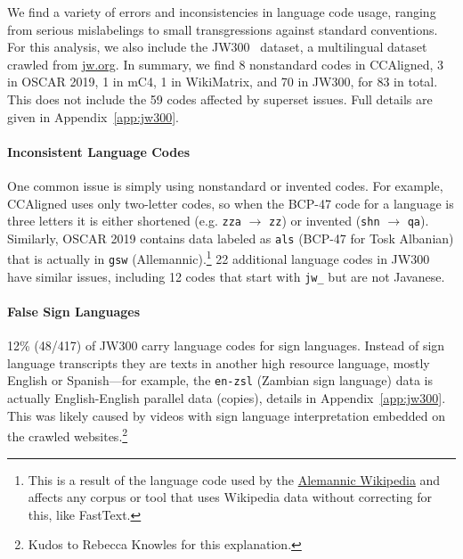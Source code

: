 We find a variety of errors and inconsistencies in language code usage, ranging from serious mislabelings to small transgressions against standard conventions. For this analysis, we also include the JW300~\citep{agic-vulic-2019-jw300} dataset, a multilingual dataset crawled from \url{jw.org}. %
In summary, we find 8 nonstandard codes in CCAligned, 3 in OSCAR 2019, 1 in mC4, 1 in WikiMatrix, and 70 in JW300, for 83 in total. This does not include the 59 codes affected by superset issues. %
Full details are given in Appendix~\ref{app:jw300}.

\paragraph{Inconsistent Language Codes} One common issue is simply using nonstandard or invented codes. For example, CCAligned uses only two-letter codes, so when the BCP-47 code for a language is three letters it is either shortened (e.g. \texttt{zza} $\rightarrow$ \texttt{zz}) or invented (\texttt{shn}  $\rightarrow$ \texttt{qa}). Similarly, OSCAR 2019 contains data labeled as \texttt{als} (BCP-47 for Tosk Albanian) that is actually in \texttt{gsw} (Allemannic).\footnote{This is a result of the language code used by the \href{https://en.wikipedia.org/wiki/Alemannic\_Wikipedia}{Alemannic Wikipedia} and affects any corpus or tool that uses Wikipedia data without correcting for this, like FastText.} 22 additional language codes in JW300 have similar issues, including 12 codes that start with \texttt{jw\_} but are not Javanese.

\paragraph{False Sign Languages}
12\% (48/417) of JW300
carry language codes for sign languages. %
Instead of sign language transcripts they are texts in another high resource language, mostly English or Spanish---for example, the \texttt{en-zsl} (Zambian sign language) data is actually English-English parallel data (copies), details in Appendix~\ref{app:jw300}. This was likely caused by videos with sign language interpretation embedded on the crawled websites.\footnote{Kudos to Rebecca Knowles for this explanation.} %


